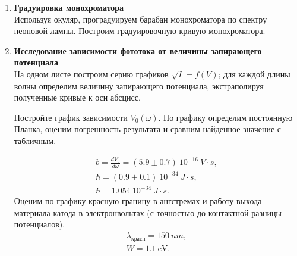 \begin{enumerate}

\item 
\textbf{Градуировка монохроматора}\\
Используя окуляр, проградуируем барабан монохроматора по спектру неоновой лампы. Построим градуировочную кривую монохроматора.
\begin{figure}[h]
\end{figure}
\item
\textbf{Исследование зависимости фототока от величины запирающего потенциала}\\
На одном листе построим серию графиков $\sqrt{I} = f(V)$; для каждой длины волны определим величину запирающего потенциала, экстраполируя полученные кривые к оси абсцисс.
\begin{figure}[h]
\end{figure}
Постройте график зависимости $V_0(\omega)$. По графику определим постоянную Планка, оценим погрешность результата и сравним найденное значение с табличным. 
\begin{figure}[h]
\end{figure}
\begin{gather*}
b = \frac{dV_0}{d\omega} = (5.9 \pm 0.7)~10^{-16}~V \cdot s,\\
\hbar = (0.9 \pm 0.1)~10^{-34}~J \cdot s,\\
\hbar = 1.054 ~10^{-34}~J \cdot s.
\end{gather*}
Оценим по графику красную границу в ангстремах и работу выхода материала катода в электронвольтах (с точностью до контактной разницы потенциалов).
\begin{gather*}
\lambda_{\text{красн}} = 150~nm,\\
W = 1.1~\text{eV}.
\end{gather*}

\clearpage


\begin{figure}
\end{figure}
\begin{figure}
\end{figure}
\begin{figure}
\end{figure}

\begin{figure}[h]
\end{figure}

\end{enumerate}

